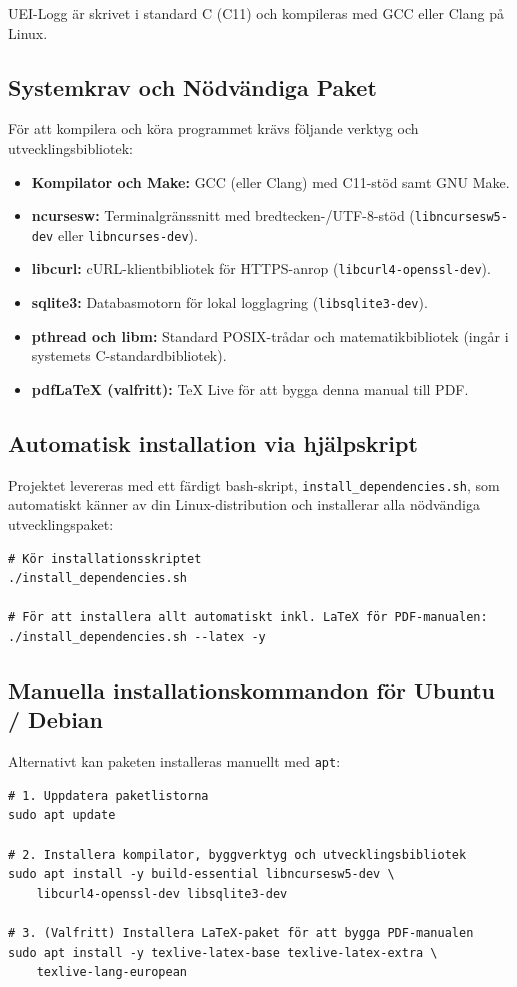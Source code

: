 \documentclass[11pt,a4paper]{article}
\begin{document}
UEI-Logg är skrivet i standard C (C11) och kompileras med GCC eller Clang på Linux.

\subsection{Systemkrav och Nödvändiga Paket}
För att kompilera och köra programmet krävs följande verktyg och utvecklingsbibliotek:
\begin{itemize}
    \item \textbf{Kompilator och Make:} GCC (eller Clang) med C11-stöd samt GNU Make.
    \item \textbf{ncursesw:} Terminalgränssnitt med bredtecken-/UTF-8-stöd (\texttt{libncursesw5-dev} eller \texttt{libncurses-dev}).
    \item \textbf{libcurl:} cURL-klientbibliotek för HTTPS-anrop (\texttt{libcurl4-openssl-dev}).
    \item \textbf{sqlite3:} Databasmotorn för lokal logglagring (\texttt{libsqlite3-dev}).
    \item \textbf{pthread och libm:} Standard POSIX-trådar och matematikbibliotek (ingår i systemets C-standardbibliotek).
    \item \textbf{pdfLaTeX (valfritt):} TeX Live för att bygga denna manual till PDF.
\end{itemize}

\subsection{Automatisk installation via hjälpskript}
Projektet levereras med ett färdigt bash-skript, \texttt{install\_dependencies.sh}, som automatiskt känner av din Linux-distribution och installerar alla nödvändiga utvecklingspaket:

\begin{verbatim}
# Kör installationsskriptet
./install_dependencies.sh

# För att installera allt automatiskt inkl. LaTeX för PDF-manualen:
./install_dependencies.sh --latex -y
\end{verbatim}

\subsection{Manuella installationskommandon för Ubuntu / Debian}
Alternativt kan paketen installeras manuellt med \texttt{apt}:

\begin{verbatim}
# 1. Uppdatera paketlistorna
sudo apt update

# 2. Installera kompilator, byggverktyg och utvecklingsbibliotek
sudo apt install -y build-essential libncursesw5-dev \
    libcurl4-openssl-dev libsqlite3-dev

# 3. (Valfritt) Installera LaTeX-paket för att bygga PDF-manualen
sudo apt install -y texlive-latex-base texlive-latex-extra \
    texlive-lang-european
\end{verbatim}
\end{document}
